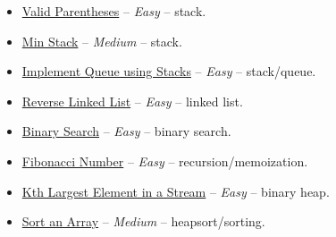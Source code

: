 \documentclass[11pt]{article}
\begin{document}
\begin{itemize}
  \item \href{https://leetcode.com/problems/valid-parentheses/}{Valid Parentheses} -- \emph{Easy} -- stack.
  \item \href{https://leetcode.com/problems/min-stack/}{Min Stack} -- \emph{Medium} -- stack.
  \item \href{https://leetcode.com/problems/implement-queue-using-stacks/}{Implement Queue using Stacks} -- \emph{Easy} -- stack/queue.
  \item \href{https://leetcode.com/problems/reverse-linked-list/}{Reverse Linked List} -- \emph{Easy} -- linked list.
  \item \href{https://leetcode.com/problems/binary-search/}{Binary Search} -- \emph{Easy} -- binary search.
  \item \href{https://leetcode.com/problems/fibonacci-number/}{Fibonacci Number} -- \emph{Easy} -- recursion/memoization.
  \item \href{https://leetcode.com/problems/kth-largest-element-in-a-stream/}{Kth Largest Element in a Stream} -- \emph{Easy} -- binary heap.
  \item \href{https://leetcode.com/problems/sort-an-array/}{Sort an Array} -- \emph{Medium} -- heapsort/sorting.
\end{itemize}
\end{document}
